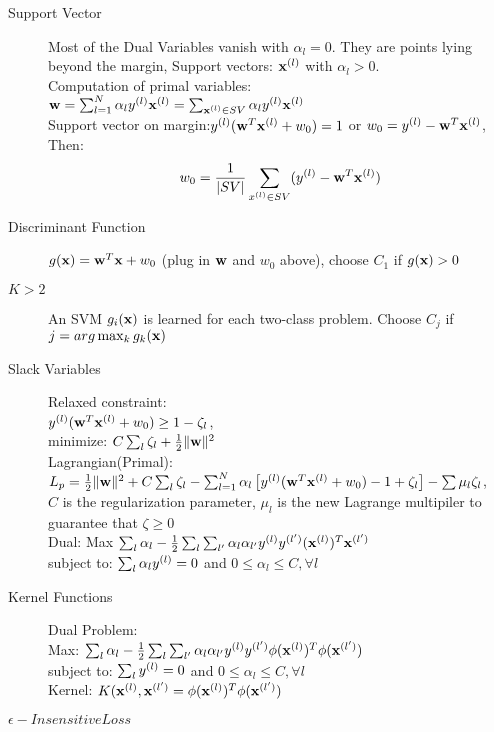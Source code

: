\begin{description}
         \item[Support Vector] Most of the Dual Variables vanish with $\alpha_l
             = 0$. They are points lying beyond the margin, Support vectors:
             $\mathbf{x}^{(l)}$ with $\alpha_l > 0$. \\
             Computation of primal variables: $\mathbf{w} = \sum_{l=1}^N
             \alpha_ly^{(l)}\mathbf{x}^{(l)} = \sum_{\mathbf{x}^{(l)}\in SV}\alpha_ly^{(l)}\mathbf{x}^{(l)}$\\
             Support vector on margin:$y^{(l)}(\mathbf{w}^T\mathbf{x}^{(l)} + w_0) =1$ or $w_0 =
             y^{(l)}-\mathbf{w}^T\mathbf{x}^{(l)}$, Then:\[w_0 = \frac{1}{|SV|}\sum_{x^{(l)}\in SV}(y^{(l)} -
             \mathbf{w}^T\mathbf{x}^{(l)})\]
         \item[Discriminant Function] $g(\mathbf{x}) = \mathbf{w}^T\mathbf{x} + w_0$ (plug in $\mathbf{w}$
             and $w_0$ above), choose $C_1$ if $g(\mathbf{x}) > 0$
         \item[$K>2$] An SVM $g_i(\mathbf{x})$ is learned for each two-class problem.
             Choose $C_j$ if $j=arg\max_k g_k(\mathbf{x})$
         \item[Slack Variables] Relaxed constraint: \\$y^{(l)}(\mathbf{w}^T\mathbf{x}^{(l)} + w_0) \geq
             1-\zeta_l$, \\minimize: $C\sum_l\zeta_l + \frac{1}{2}\|\mathbf{w}\|^2$ \\
             Lagrangian(Primal):\\
             $L_p = \frac{1}{2}\|\mathbf{w}\|^2 + \\C\sum_l\zeta_l -
             \sum_{l=1}^N\alpha_l\left[ y^{(l)}(\mathbf{w}^T\mathbf{x}^{(l)} + w_0)-1+\zeta_l
             \right] - \sum\mu_l\zeta_l$, \\$C$ is the regularization parameter,
             $\mu_l$ is the new Lagrange multipiler to guarantee that
             $\zeta\geq0$\\
             Dual: Max $\sum_l\alpha_l-\frac{1}{2}\sum_l
             \sum_{l'}\alpha_l\alpha_{l'}y^{(l)} y^{(l')}(\mathbf{x}^{(l)})^T\mathbf{x}^{(l')}$\\
             subject to: $\sum_l\alpha_l y^{(l)} = 0$ and $0\leq \alpha_l \leq C,
             \forall l$
         \item[Kernel Functions] Dual Problem:\\
             Max: $\sum_l \alpha_l -\frac{1}{2}\sum_l \sum_{l'}\alpha_l
             \alpha_{l'}y^{(l)} y^{(l')}\phi(\mathbf{x}^{(l)})^T\phi(\mathbf{x}^{(l')})$\\
         subject to: $\sum_ly^{(l)} =0$ and $0\leq \alpha_l \leq C, \forall l$\\
         Kernel: $K(\mathbf{x}^{(l)},\mathbf{x}^{(l')} = \phi(\mathbf{x}^{(l)})^T\phi(\mathbf{x}^{(l')})$
     \item[$\epsilon-Insensitive Loss$] 

\end{description}
